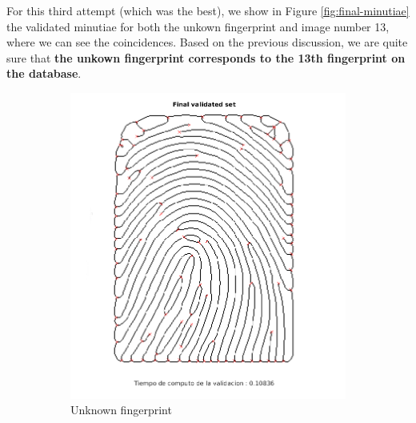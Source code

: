 \documentclass[11pt]{article}
\begin{document}
For this third attempt (which was the best), we show in Figure \ref{fig:final-minutiae} the validated minutiae for both the unkown fingerprint and image number 13, where we can see the coincidences. Based on the previous discussion, we are quite sure that \textbf{the unkown fingerprint corresponds to the 13th fingerprint on the database}.
\begin{figure}[h!]
  \centering
       \begin{subfigure}[t]{0.45\textwidth}
         \centering
         \includegraphics[scale=0.425]{img/unknown_3-7-3}
         \caption{Unknown fingerprint}
     \end{subfigure}%
     \quad
     \begin{subfigure}[t]{0.45\textwidth}
         \centering

\end{subfigure}
\end{figure}
\end{document}
